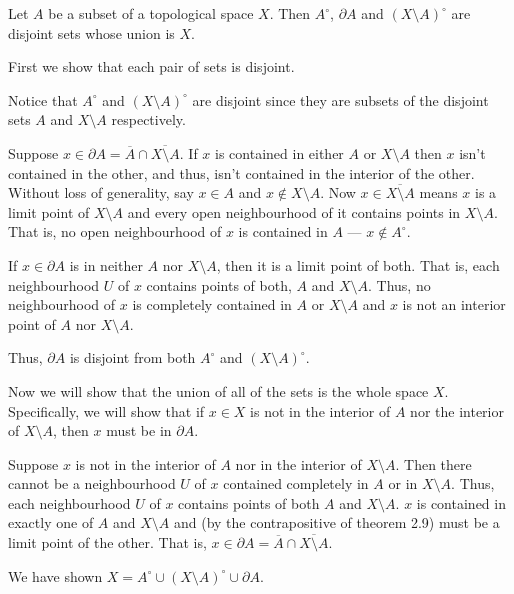 \documentclass[12 pt, letterpaper]{hmcpset}
\begin{document}
\begin{problem}[2.28]
	Let $A$ be a subset of a topological space $X$. Then $A^{\circ}$, $\partial A$ and $(X \setminus A)^{\circ}$ are disjoint sets whose union is $X$.
\end{problem}

\begin{solution}
	First we show that each pair of sets is disjoint.

	Notice that $A^{\circ}$ and $(X \setminus A)^{\circ}$ are disjoint since they are subsets of the disjoint sets $A$ and $X \setminus A$ respectively.

	Suppose $x \in \partial A = \overline{A} \cap \overline{X \setminus A}$. If $x$ is contained in either $A$ or $X \setminus A$ then $x$ isn't contained in the other, and thus, isn't contained in the interior of the other. Without loss of generality, say $x \in A$ and $x \notin X \setminus A$. Now $x \in \overline{X \setminus A}$ means $x$ is a limit point of $X \setminus A$ and every open neighbourhood of it contains points in $X \setminus A$. That is, no open neighbourhood of $x$ is contained in $A$ --- $x \notin A^{\circ}$.

	If $x \in \partial A$ is in neither $A$ nor $X \setminus A$, then it is a limit point of both. That is, each neighbourhood $U$ of $x$ contains points of both, $A$ and $X \setminus A$. Thus, no neighbourhood of $x$ is completely contained in $A$ or $X \setminus A$ and $x$ is not an interior point of $A$ nor $X \setminus A$. 

	Thus, $\partial A$ is disjoint from both $A^\circ$ and $(X \setminus A)^\circ$.

	Now we will show that the union of all of the sets is the whole space $X$. Specifically, we will show that if $x \in X$ is not in the interior of $A$ nor the interior of $X \setminus A$, then $x$ must be in $\partial A$.

	Suppose $x$ is not in the interior of $A$ nor in the interior of $X \setminus A$. Then there cannot be a neighbourhood $U$ of $x$ contained completely in $A$ or in $X \setminus A$. Thus, each neighbourhood $U$ of $x$ contains points of both $A$ and $X \setminus A$. $x$ is contained in exactly one of $A$ and $X \setminus A$ and (by the contrapositive of theorem 2.9) must be a limit point of the other. That is, $x \in \partial A = \overline{A} \cap \overline{X \setminus A}$.

	We have shown $X = A^{\circ} \cup (X \setminus A)^{\circ} \cup \partial A$.
\end{solution}
\end{document}
